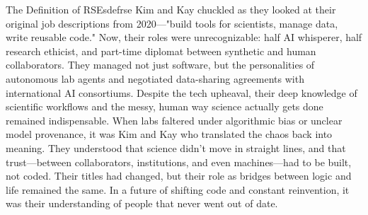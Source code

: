 \documentclass{eceasst}
\begin{document}
\begin{story}{The Definition of RSEs}{defrse}
Kim and Kay chuckled as they looked at their original job descriptions from 2020—"build tools for scientists, manage data, write reusable code."
Now, their roles were unrecognizable: half AI whisperer, half research ethicist, and part-time diplomat between synthetic and human collaborators.
They managed not just software, but the personalities of autonomous lab agents and negotiated data-sharing agreements with international AI consortiums.
Despite the tech upheaval, their deep knowledge of scientific workflows and the messy, human way science actually gets done remained indispensable.
When labs faltered under algorithmic bias or unclear model provenance, it was Kim and Kay who translated the chaos back into meaning.
They understood that science didn’t move in straight lines, and that trust—between collaborators, institutions, and even machines—had to be built, not coded.
Their titles had changed, but their role as bridges between logic and life remained the same.
In a future of shifting code and constant reinvention, it was their understanding of people that never went out of date.

\end{story}
\end{document}
